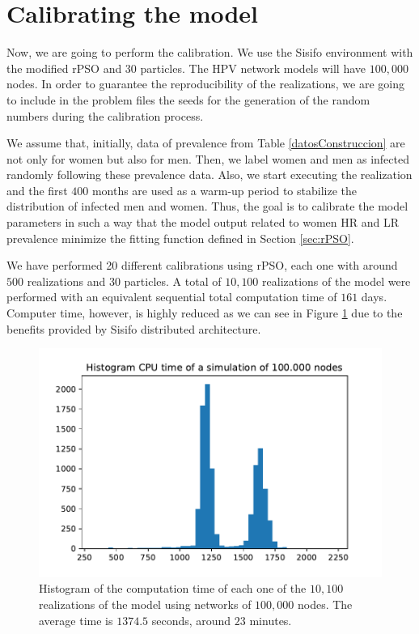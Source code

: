 \section{Calibrating the model}
Now, we are going to perform the calibration. We use the Sisifo environment with the modified rPSO and 30 particles. The HPV network models will have $100,000$ nodes. In order to guarantee the reproducibility of the realizations, we are going to include in the problem files the seeds for the generation of the random numbers during the calibration process.

We assume that, initially, data of prevalence from Table \ref{datosConstruccion} are not only for women but also for men. Then, we label women and men as infected randomly following these prevalence data. Also, we start executing the realization and the first $400$ months are used as a warm-up period to stabilize the distribution of infected men and women. Thus, the goal is to calibrate the model parameters in such a way that the model output related to women HR and LR prevalence minimize the fitting function defined in Section \ref{sec:rPSO}.

We have performed 20 different calibrations using rPSO, each one with around $500$ realizations and $30$ particles. A total of $10,100$ realizations of the model were performed with an equivalent sequential total computation time of $161$ days. Computer time, however, is highly reduced as we can see in Figure \ref{histogram} due to the benefits provided by Sisifo distributed architecture.

\begin{figure}[!h]
	\centering
	\includegraphics[width=0.6\linewidth]{IMGs/1.-Calibrado/Hist_CPU_time.pdf}
	\caption{Histogram of the computation time of each one of the $10,100$ realizations of the model using networks of $100,000$ nodes. The average time is $1374.5$ seconds, around $23$ minutes.}
	\label{histogram}
\end{figure}

